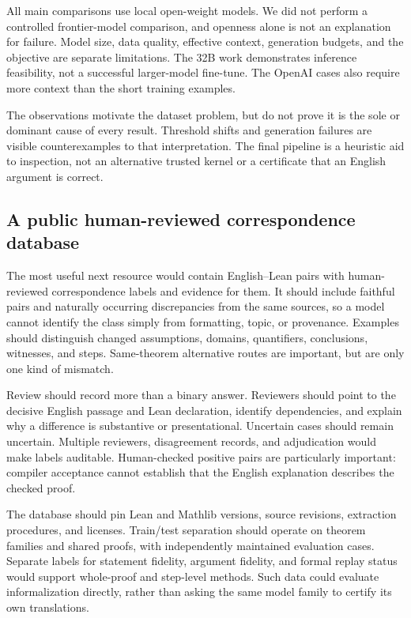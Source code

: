\documentclass[sigconf,nonacm]{acmart}
\begin{document}
All main comparisons use local open-weight models. We did not perform a controlled frontier-model comparison, and openness alone is not an explanation for failure. Model size, data quality, effective context, generation budgets, and the objective are separate limitations. The 32B work demonstrates inference feasibility, not a successful larger-model fine-tune. The OpenAI cases also require more context than the short training examples.

The observations motivate the dataset problem, but do not prove it is the sole or dominant cause of every result. Threshold shifts and generation failures are visible counterexamples to that interpretation. The final pipeline is a heuristic aid to inspection, not an alternative trusted kernel or a certificate that an English argument is correct.

\subsection{A public human-reviewed correspondence database}
The most useful next resource would contain English--Lean pairs with human-reviewed correspondence labels and evidence for them. It should include faithful pairs and naturally occurring discrepancies from the same sources, so a model cannot identify the class simply from formatting, topic, or provenance. Examples should distinguish changed assumptions, domains, quantifiers, conclusions, witnesses, and steps. Same-theorem alternative routes are important, but are only one kind of mismatch.

Review should record more than a binary answer. Reviewers should point to the decisive English passage and Lean declaration, identify dependencies, and explain why a difference is substantive or presentational. Uncertain cases should remain uncertain. Multiple reviewers, disagreement records, and adjudication would make labels auditable. Human-checked positive pairs are particularly important: compiler acceptance cannot establish that the English explanation describes the checked proof.

The database should pin Lean and Mathlib versions, source revisions, extraction procedures, and licenses. Train/test separation should operate on theorem families and shared proofs, with independently maintained evaluation cases. Separate labels for statement fidelity, argument fidelity, and formal replay status would support whole-proof and step-level methods. Such data could evaluate informalization directly, rather than asking the same model family to certify its own translations.
\end{document}
